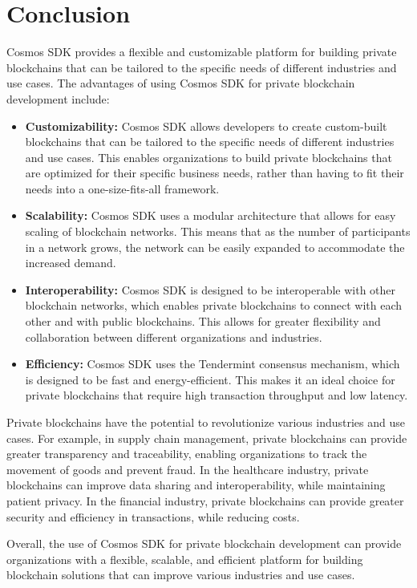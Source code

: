 \section{Conclusion}
Cosmos SDK provides a flexible and customizable platform for building private blockchains that can be tailored to the specific needs of different industries and use cases. The advantages of using Cosmos SDK for private blockchain development include:

\begin{itemize}
    \item \textbf{Customizability:} Cosmos SDK allows developers to create custom-built blockchains that can be tailored to the specific needs of different industries and use cases. This enables organizations to build private blockchains that are optimized for their specific business needs, rather than having to fit their needs into a one-size-fits-all framework.
    \item \textbf{Scalability:} Cosmos SDK uses a modular architecture that allows for easy scaling of blockchain networks. This means that as the number of participants in a network grows, the network can be easily expanded to accommodate the increased demand.
    \item \textbf{Interoperability:} Cosmos SDK is designed to be interoperable with other blockchain networks, which enables private blockchains to connect with each other and with public blockchains. This allows for greater flexibility and collaboration between different organizations and industries.
    \item \textbf{Efficiency:} Cosmos SDK uses the Tendermint consensus mechanism, which is designed to be fast and energy-efficient. This makes it an ideal choice for private blockchains that require high transaction throughput and low latency.
\end{itemize}

Private blockchains have the potential to revolutionize various industries and use cases. For example, in supply chain management, private blockchains can provide greater transparency and traceability, enabling organizations to track the movement of goods and prevent fraud. In the healthcare industry, private blockchains can improve data sharing and interoperability, while maintaining patient privacy. In the financial industry, private blockchains can provide greater security and efficiency in transactions, while reducing costs.

Overall, the use of Cosmos SDK for private blockchain development can provide organizations with a flexible, scalable, and efficient platform for building blockchain solutions that can improve various industries and use cases.